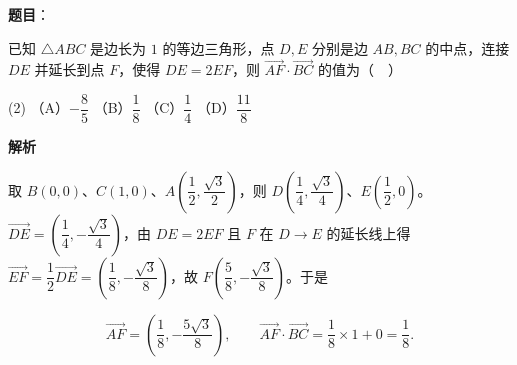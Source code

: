 \begin{answer}

\textbf{题目}：

已知 \(\triangle ABC\) 是边长为 \(1\) 的等边三角形，点 \(D,E\) 分别是边 \(AB,BC\) 的中点，连接 \(DE\) 并延长到点 \(F\)，使得 \(DE=2EF\)，则 \(\overrightarrow{AF}\cdot\overrightarrow{BC}\) 的值为（　）

\begin{gkopts}(2)
\task （A）\(-\dfrac{8}{5}\)
\task （B）\(\dfrac{1}{8}\)
\task （C）\(\dfrac{1}{4}\)
\task （D）\(\dfrac{11}{8}\)
\end{gkopts}

\Needspace{0.49\textheight}

\textbf{解析}

取 \(B(0,0)\)、\(C(1,0)\)、\(A\left(\dfrac{1}{2},\dfrac{\sqrt{3}}{2}\right)\)，则 \(D\left(\dfrac{1}{4},\dfrac{\sqrt{3}}{4}\right)\)、\(E\left(\dfrac{1}{2},0\right)\)。\(\overrightarrow{DE}=\left(\dfrac{1}{4},-\dfrac{\sqrt{3}}{4}\right)\)，由 \(DE=2EF\) 且 \(F\) 在 \(D\to E\) 的延长线上得 \(\overrightarrow{EF}=\dfrac{1}{2}\overrightarrow{DE}=\left(\dfrac{1}{8},-\dfrac{\sqrt{3}}{8}\right)\)，故 \(F\left(\dfrac{5}{8},-\dfrac{\sqrt{3}}{8}\right)\)。于是

\nopagebreak[4]
\[
\overrightarrow{AF}=\left(\dfrac{1}{8},-\dfrac{5\sqrt{3}}{8}\right),\qquad
\overrightarrow{AF}\cdot\overrightarrow{BC}=\dfrac{1}{8}\times1+0=\dfrac{1}{8}.
\]


\end{answer}
